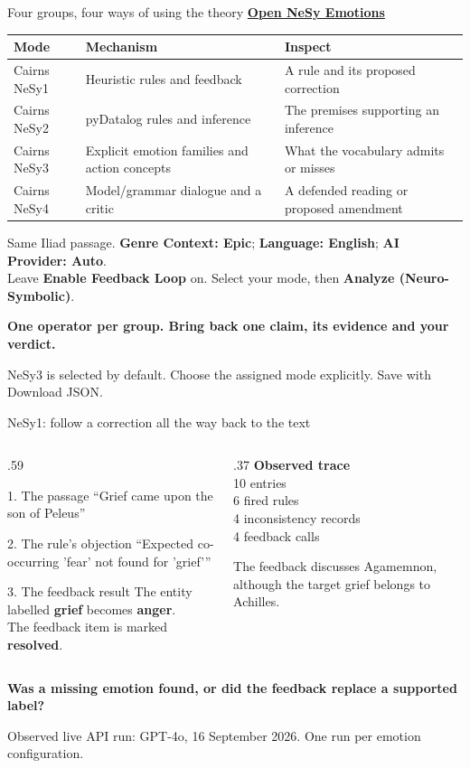 \documentclass[aspectratio=169,10pt]{beamer}
\newcommand{\key}[1]{\textcolor{aegean}{\textbf{#1}}}
\newcommand{\hl}[1]{\textcolor{terracotta}{\textbf{#1}}}
\newcommand{\source}[1]{\vfill{\scriptsize\color{slate}#1\par}}
\newcommand{\observed}{\source{Observed live API run: GPT-4o, 16 September 2026. One run per emotion configuration.}}
\newcommand{\question}[1]{\medskip\par\key{#1}\par}
\newcommand{\nesylink}{\href{https://greek-app-heaven-medea.livelyhill-85880e66.westeurope.azurecontainerapps.io/emotions-nesy}{\textbf{Open NeSy Emotions}}}
\begin{document}
\begin{frame}{Four groups, four ways of using the theory}
  \nesylink\par\medskip
  \small
  \begin{tabularx}{\textwidth}{@{}lXX@{}}
    \toprule
    \textbf{Mode} & \textbf{Mechanism} & \textbf{Inspect}\\
    \midrule
    Cairns NeSy1 & Heuristic rules and feedback & A rule and its proposed correction\\
    Cairns NeSy2 & pyDatalog rules and inference & The premises supporting an inference\\
    Cairns NeSy3 & Explicit emotion families and action concepts & What the vocabulary admits or misses\\
    Cairns NeSy4 & Model/grammar dialogue and a critic & A defended reading or proposed amendment\\
    \bottomrule
  \end{tabularx}
  \medskip
  Same Iliad passage. \textbf{Genre Context: Epic}; \textbf{Language: English}; \textbf{AI Provider: Auto}.\\
  Leave \textbf{Enable Feedback Loop} on. Select your mode, then \textbf{Analyze (Neuro-Symbolic)}.
  \question{One operator per group. Bring back one claim, its evidence and your verdict.}
  \source{NeSy3 is selected by default. Choose the assigned mode explicitly. Save with Download JSON.}
\end{frame}

\begin{frame}{NeSy1: follow a correction all the way back to the text}
  \begin{columns}[T]
    \begin{column}{.59\textwidth}
      \begin{block}{1. The passage}
        “Grief came upon the son of Peleus”
      \end{block}
      \begin{block}{2. The rule's objection}
        “Expected co-occurring 'fear' not found for 'grief'”
      \end{block}
      \begin{block}{3. The feedback result}
        The entity labelled \hl{grief} becomes \hl{anger}.\\
        The feedback item is marked \textbf{resolved}.
      \end{block}
    \end{column}
    \begin{column}{.37\textwidth}
      \textbf{Observed trace}\\[6pt]
      10 entries\\
      6 fired rules\\
      4 inconsistency records\\
      4 feedback calls
      \medskip\par
      \small The feedback discusses Agamemnon, although the target grief belongs to Achilles.
    \end{column}
  \end{columns}
  \question{Was a missing emotion found, or did the feedback replace a supported label?}
  \observed
\end{frame}
\end{document}

